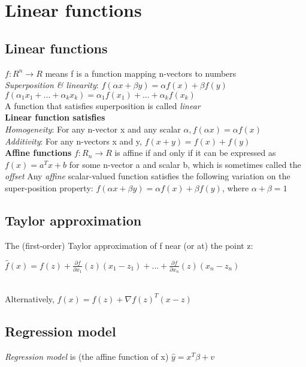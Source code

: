\section{Linear functions}
\subsection{Linear functions} 
$f : R^n \to R$ means f is a function mapping n-vectors to numbers\\
\textit{Superposition \& linearity}: 
$f(\alpha x + \beta y) = \alpha f(x) + \beta f(y)$\\
\textbullet $ f(\alpha_1 x_1 +...+ \alpha_k x_k) = \alpha_1 f(x_1)+...+ \alpha_k f(x_k)$\\
A function that satisfies superposition is called \textit{linear}\\
\textbf{Linear function satisfies}\\
\textbullet \textit{Homogeneity}: For any n-vector x and any scalar $\alpha, f(\alpha x) = \alpha f(x)$ \\
\textbullet \textit{Additivity}: For any n-vectors x and y, $f(x + y) = f(x) + f(y)$\\
\textbf{Affine functions}
$f:R_n \to R$ is affine if and only if it can be expressed as $f(x) = a^Tx + b$ for some n-vector a and scalar b, which is sometimes called the \textit{offset}
\textbullet Any \textit{affine} scalar-valued function satisfies the following variation on the super-position property:
$f(\alpha x + \beta y) = \alpha f(x) + \beta f(y)$, where $\alpha + \beta = 1$

\subsection{Taylor approximation}
The (first-order) Taylor approximation of f near (or at) the point z:\\
\begin{scriptsize}
$\hat{f}(x)= f(z) + \frac{\partial f}{\partial x_1}(z)(x_1 - z_1) + ... +  \frac{\partial f}{\partial x_n}(z)(x_n - z_n)$
\end{scriptsize}\\
Alternatively,
$\hat{f}(x)=f(z)+ \nabla f(z)^T(x-z)$
\subsection{Regression model}
\textit{Regression model} is (the affine function of x) $\hat{y} = x^T \beta + v$
